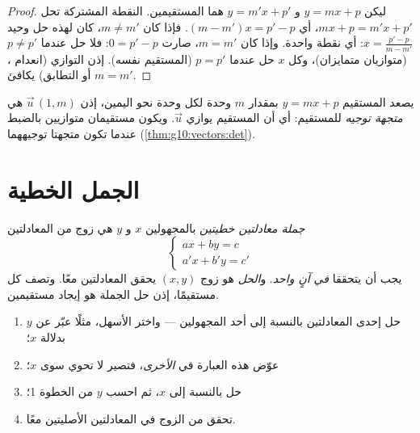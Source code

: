 \begin{proof}
ليكن $y = mx + p$ و $y = m'x + p'$ هما المستقيمين. النقطة المشتركة
تحل $mx + p = m'x + p'$، أي $(m - m')x = p' - p$. فإذا كان $m \neq m'$،
كان لهذه  حل وحيد $x = \frac{p' - p}{m - m'}$: أي نقطة
 واحدة. وإذا كان $m = m'$، صارت  $0 = p' - p$: فلا
حل عندما $p \neq p'$ (متوازيان متمايزان)، وكل $x$ حل عندما $p = p'$
(المستقيم نفسه). إذن التوازي (انعدام ، أو التطابق)
يكافئ $m = m'$.
\end{proof}

\begin{remark}
يصعد المستقيم $y = mx + p$ بمقدار $m$ وحدة لكل وحدة نحو اليمين، إذن
 $\vec u\,(1, m)$ هي \emph{متجهة
توجيه} للمستقيم: أي أن المستقيم يوازي
$\vec u$. ويكون مستقيمان متوازيين بالضبط عندما تكون متجهتا توجيههما
 (\cref{thm:g10:vectors:det}).
\end{remark}

\section{الجمل الخطية}

\begin{definition}\label{def:g10:lines:system}
\emph{جملة معادلتين خطيتين} بالمجهولين
$x$ و $y$ هي زوج من المعادلتين
\[
\begin{cases}
a x + b y = c \\
a' x + b' y = c'
\end{cases}
\]
يجب أن يتحققا \emph{في آنٍ واحد}. و\emph{الحل} هو زوج
$(x, y)$ يحقق المعادلتين معًا. وتصف كل  مستقيمًا، إذن حل
الجملة هو إيجاد  مستقيمين.
\end{definition}

\begin{method}[التعويض]\label{met:g10:lines:substitution}
\begin{enumerate}
  \item حل إحدى المعادلتين بالنسبة إلى أحد المجهولين --- واختر الأسهل، مثلًا
        عبّر عن $y$ بدلالة $x$؛
  \item عوّض هذه العبارة في  \emph{الأخرى}، فتصير
        لا تحوي سوى $x$؛
  \item حل بالنسبة إلى $x$، ثم احسب $y$ من الخطوة 1؛
  \item تحقق من الزوج في المعادلتين الأصليتين معًا.
\end{enumerate}
\end{method}

